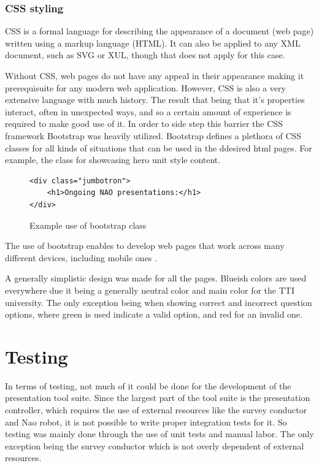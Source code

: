 \documentclass[12pt, fleqn, a4paper]{article}
\begin{document}
\subsubsection{CSS styling}
CSS is a formal language for describing the appearance of a document (web page) written using a markup language (HTML). It can also be applied to any XML document, such as SVG or XUL, though that does not apply for this case.\par
Without CSS, web pages do not have any appeal in their appearance making it prerequisuite for any modern web application. However, CSS is also a very extensive language with much history. The result that being that it's properties interact, often in unexpected ways, and so a certain amount of experience is required to make good use of it. 
In order to side step this barrier the CSS framework Bootstrap was heavily utilized. Bootstrap defines a plethora of CSS classes for all kinds of situations that can be used in the ddesired html pages. For example, the class  for showcasing hero unit style content.
\begin{figure}[H]
	\centering
	\begin{verbatim} 
<div class="jumbotron">
    <h1>Ongoing NAO presentations:</h1>
</div>
	\end{verbatim}
	\caption{Example use of bootstrap class}
\end{figure}
The use of bootstrap enables to develop web pages that work across many different devices, including mobile ones \citep{bootstrap}.\par
A generally simplistic design was made for all the pages. Blueish colors are used everywhere due it being a generally neutral color and main color for the TTI university. The only exception being when showing correct and incorrect question options, where green is used indicate a valid option, and red for an invalid one.\par
\section{Testing}
In terms of testing, not much of it could be done for the development of the presentation tool suite. Since the largest part of the tool suite is the presentation controller, which requires the use of external resources like the survey conductor and Nao robot, it is not possible to write proper integration tests for it. So testing was mainly done through the use of unit tests and manual labor. The only exception being the survey conductor which is not overly dependent of external resources.
\end{document}
